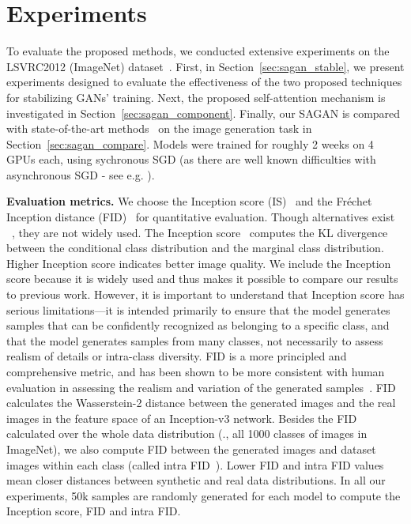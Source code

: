 \documentclass{article}
\begin{document}
\section{Experiments}\label{sec:sagan_exp}

To evaluate the proposed methods, we conducted extensive experiments on the LSVRC2012 (ImageNet) dataset~\cite{ILSVRC15}. First, in Section~\ref{sec:sagan_stable}, we present experiments designed to evaluate the effectiveness of the two proposed techniques for stabilizing GANs' training. Next, the proposed self-attention mechanism is investigated in Section~\ref{sec:sagan_component}. Finally, our SAGAN is compared with state-of-the-art methods~\cite{Odena2016,Miyato18b} on the image generation task in Section~\ref{sec:sagan_compare}.
Models were trained for roughly 2 weeks on 4 GPUs each, using sychronous SGD (as there are well known difficulties with asynchronous SGD - see e.g. \cite{FASGD}).
 
 

\textbf{Evaluation metrics. }
{
  We choose the Inception score (IS)~\cite{Salimans2016} and the Fr\'echet Inception distance (FID)~\cite{HeuselRUNH17} for quantitative evaluation.
  Though alternatives exist ~\cite{HYPE,GEOMETRYSCORE,SKILLRATING}, they are not widely used.
  The Inception score~\cite{Salimans2016} computes the KL divergence between the conditional class distribution and the marginal class distribution. Higher Inception score indicates better image quality. We include the Inception score because it is widely used and thus makes it possible to compare our results to previous work. However, it is important to understand that Inception score has serious limitations---it is intended primarily to ensure that the model generates  samples that can be confidently recognized as belonging to a specific class, and that the model generates samples from many classes, not necessarily to assess realism of details or intra-class diversity.
 FID is a more principled and comprehensive metric, and has been shown to be more consistent with human evaluation in assessing the realism and variation of the generated samples~\cite{HeuselRUNH17}. FID calculates the Wasserstein-2 distance between the generated images and the real images in the feature space of an Inception-v3 network. 
 Besides the FID calculated over the whole data distribution (\ie., all 1000 classes of images in ImageNet), we also compute FID between the generated images and dataset images within each class (called intra FID~\cite{Miyato18b}). Lower FID and intra FID values mean closer distances between synthetic and real data distributions. In all our experiments, 50k samples are randomly generated for each model to compute the Inception score, FID and intra FID. 
}
\end{document}
